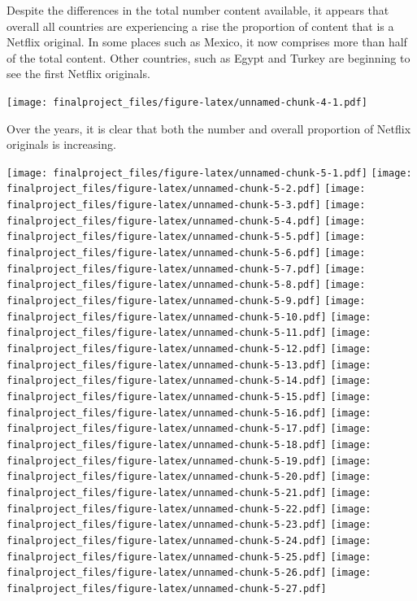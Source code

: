 \documentclass[
]{article}
\begin{document}
Despite the differences in the total number content available, it
appears that overall all countries are experiencing a rise the
proportion of content that is a Netflix original. In some places such as
Mexico, it now comprises more than half of the total content. Other
countries, such as Egypt and Turkey are beginning to see the first
Netflix originals.

\texttt{[image: finalproject\_files/figure-latex/unnamed-chunk-4-1.pdf]}

Over the years, it is clear that both the number and overall proportion
of Netflix originals is increasing.

\texttt{[image: finalproject\_files/figure-latex/unnamed-chunk-5-1.pdf]}
\texttt{[image: finalproject\_files/figure-latex/unnamed-chunk-5-2.pdf]}
\texttt{[image: finalproject\_files/figure-latex/unnamed-chunk-5-3.pdf]}
\texttt{[image: finalproject\_files/figure-latex/unnamed-chunk-5-4.pdf]}
\texttt{[image: finalproject\_files/figure-latex/unnamed-chunk-5-5.pdf]}
\texttt{[image: finalproject\_files/figure-latex/unnamed-chunk-5-6.pdf]}
\texttt{[image: finalproject\_files/figure-latex/unnamed-chunk-5-7.pdf]}
\texttt{[image: finalproject\_files/figure-latex/unnamed-chunk-5-8.pdf]}
\texttt{[image: finalproject\_files/figure-latex/unnamed-chunk-5-9.pdf]}
\texttt{[image: finalproject\_files/figure-latex/unnamed-chunk-5-10.pdf]}
\texttt{[image: finalproject\_files/figure-latex/unnamed-chunk-5-11.pdf]}
\texttt{[image: finalproject\_files/figure-latex/unnamed-chunk-5-12.pdf]}
\texttt{[image: finalproject\_files/figure-latex/unnamed-chunk-5-13.pdf]}
\texttt{[image: finalproject\_files/figure-latex/unnamed-chunk-5-14.pdf]}
\texttt{[image: finalproject\_files/figure-latex/unnamed-chunk-5-15.pdf]}
\texttt{[image: finalproject\_files/figure-latex/unnamed-chunk-5-16.pdf]}
\texttt{[image: finalproject\_files/figure-latex/unnamed-chunk-5-17.pdf]}
\texttt{[image: finalproject\_files/figure-latex/unnamed-chunk-5-18.pdf]}
\texttt{[image: finalproject\_files/figure-latex/unnamed-chunk-5-19.pdf]}
\texttt{[image: finalproject\_files/figure-latex/unnamed-chunk-5-20.pdf]}
\texttt{[image: finalproject\_files/figure-latex/unnamed-chunk-5-21.pdf]}
\texttt{[image: finalproject\_files/figure-latex/unnamed-chunk-5-22.pdf]}
\texttt{[image: finalproject\_files/figure-latex/unnamed-chunk-5-23.pdf]}
\texttt{[image: finalproject\_files/figure-latex/unnamed-chunk-5-24.pdf]}
\texttt{[image: finalproject\_files/figure-latex/unnamed-chunk-5-25.pdf]}
\texttt{[image: finalproject\_files/figure-latex/unnamed-chunk-5-26.pdf]}
\texttt{[image: finalproject\_files/figure-latex/unnamed-chunk-5-27.pdf]}
\end{document}
